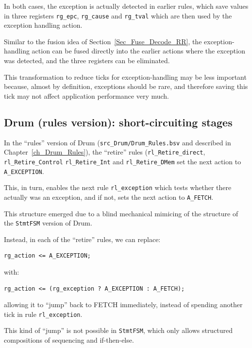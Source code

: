 In both cases, the exception is actually detected in earlier rules,
which save values in three registers \verb|rg_epc|, \verb|rg_cause|
and \verb|rg_tval| which are then used by the exception handling
action.

Similar to the fusion idea of Section~\ref{Sec_Fuse_Decode_RR}, the
exception-handling action can be fused directly into the earlier
actions where the exception was detected, and the three registers can
be eliminated.

This transformation to reduce ticks for exception-handling may be less
important because, almost by definition, exceptions should be rare,
and therefore saving this tick may not affect application performance
very much.


\subsection{Drum (rules version): short-circuiting stages}

In the ``rules'' version of Drum (\verb|src_Drum/Drum_Rules.bsv| and
described in Chapter~\ref{ch_Drum_Rules}), the ``retire'' rules
(\verb|rl_Retire_direct|, \verb|rl_Retire_Control|
\verb|rl_Retire_Int| and \verb|rl_Retire_DMem| set the next action to
\verb|A_EXCEPTION|.

This, in turn, enables the next rule \verb|rl_exception| which tests
whether there actually was an exception, and if not, sets the next
action to \verb|A_FETCH|.

This structure emerged due to a blind mechanical mimicing of the
structure of the \verb|StmtFSM| version of Drum.

Instead, in each of the ``retire'' rules, we can replace:

{\footnotesize
\begin{Verbatim}[frame=single]
      rg_action <= A_EXCEPTION;
\end{Verbatim}
}

with:

{\footnotesize
\begin{Verbatim}[frame=single]
      rg_action <= (rg_exception ? A_EXCEPTION : A_FETCH);
\end{Verbatim}
}

allowing it to ``jump'' back to FETCH immediately, instead of spending
another tick in rule \verb|rl_exception|.

This kind of ``jump'' is not possible in \verb|StmtFSM|, which only
allows structured compositions of sequencing and if-then-else.

